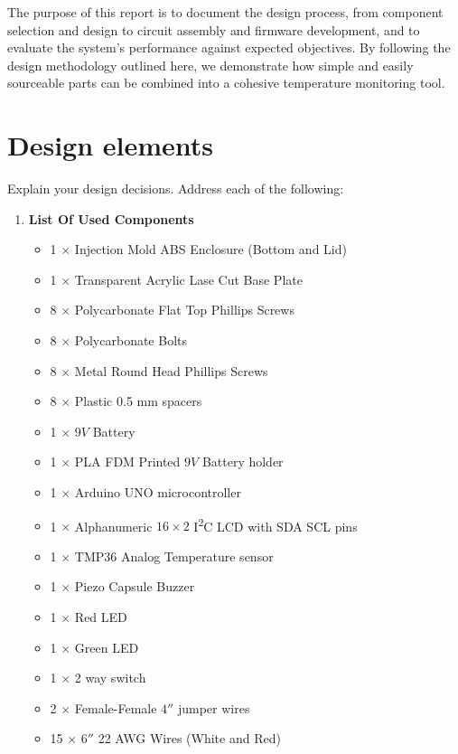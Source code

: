 \documentclass[10pt]{article}
\begin{document}
The purpose of this report is to document the design process, from component
selection and design to circuit assembly and firmware development, and
to evaluate the system's performance against expected objectives. By following
the design methodology outlined here, we demonstrate how simple and
easily sourceable parts can be combined into a cohesive temperature
monitoring tool.


\section{Design elements} Explain your design decisions. Address each of the
following:

\begin{enumerate}
	\item \textbf{List Of Used Components}
	      \begin{multicols}{2}
		      \begin{itemize}
			      \item 1 $\times$ Injection Mold ABS Enclosure (Bottom and Lid)
			      \item 1 $\times$ Transparent Acrylic Lase Cut Base Plate
			      \item 8 $\times$ Polycarbonate Flat Top Phillips Screws
			      \item 8 $\times$ Polycarbonate Bolts
			      \item 8 $\times$ Metal Round Head Phillips Screws
			      \item 8 $\times$ Plastic 0.5 mm spacers
			      \item 1 $\times$ $9 V$ Battery
			      \item 1 $\times$ PLA FDM Printed $9 V$ Battery holder
			      \item 1 $\times$ Arduino UNO microcontroller
			      \item 1 $\times$ Alphanumeric $16 \times 2$ I\textsuperscript{2}C LCD with SDA SCL pins
			      \item 1 $\times$ TMP36 Analog Temperature sensor
			      \item 1 $\times$ Piezo Capsule Buzzer
			      \item 1 $\times$ Red LED
			      \item 1 $\times$ Green LED
			      \item 1 $\times$ 2 way switch
			      \item 2 $\times$ Female-Female $4''$ jumper wires
			      \item 15 $\times$ $6''$ 22 AWG Wires (White and Red)

\end{itemize}
\end{multicols}
\end{enumerate}
\end{document}
